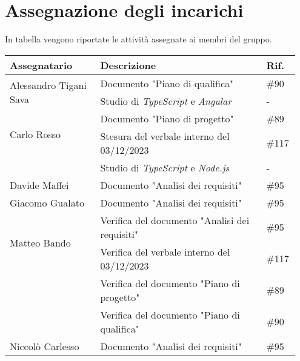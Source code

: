 \section{Assegnazione degli incarichi}
In tabella vengono riportate le attività assegnate ai membri del gruppo.
\begin{center}
	{
		\renewcommand{\arraystretch}{1.5}
		\begin{tabular}{p{0.30\linewidth}|p{0.55\linewidth}|p{0.10\linewidth}}
			\textbf{Assegnatario}                   & \textbf{Descrizione}                             & \textbf{Rif.} \\
			\hline
			\multirow{2}{*}{Alessandro Tigani Sava} & Documento "Piano di qualifica"                   & \#90          \\
			\cline{2-3}
			                                        & Studio di \textit{TypeScript} e \textit{Angular} & -             \\
			\hline
			\multirow{2}{*}{Carlo Rosso}            & Documento "Piano di progetto"                    & \#89          \\
			\cline{2-3}
			                                        & Stesura del verbale interno del 03/12/2023       & \#117         \\
			\cline{2-3}
			                                        & Studio di \textit{TypeScript} e \textit{Node.js} & -             \\
			\hline
			Davide Maffei                           & Documento "Analisi dei requisiti"                & \#95          \\
			\hline
			Giacomo Gualato                         & Documento "Analisi dei requisiti"                & \#95          \\
			\hline
			\multirow{2}{*}{Matteo Bando}           & Verifica del documento "Analisi dei requisiti"   & \#95          \\
			\cline{2-3}
			                                        & Verifica del verbale interno del 03/12/2023      & \#117         \\
			\cline{2-3}
			                                        & Verifica del documento "Piano di progetto"       & \#89          \\
			\cline{2-3}
			                                        & Verifica del documento "Piano di qualifica"      & \#90          \\
			\hline
			Niccolò Carlesso                        & Documento "Analisi dei requisiti"                & \#95          \\
			\hline
		\end{tabular}
	}
\end{center}
